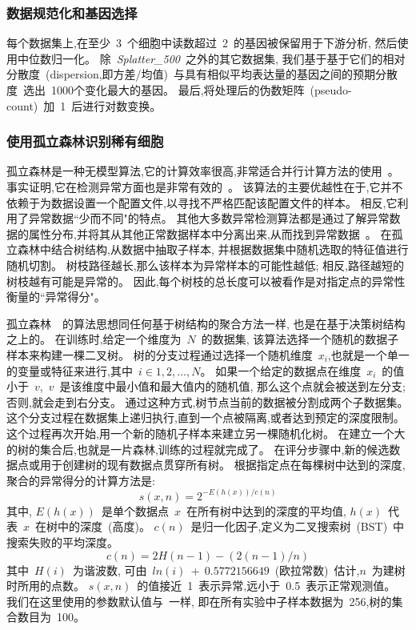 \subsubsection{数据规范化和基因选择}
\label{subsec:datapreprocessing} 
每个数据集上,在至少~3~个细胞中读数超过~2~的基因被保留用于下游分析,
然后使用中位数归一化。
除~\textit{Splatter\_500}~之外的其它数据集,
我们基于基于它们的相对分散度~(dispersion,即方差/均值)~与具有相似平均表达量的基因之间的预期分散度~\cite{zheng2017massively,macosko2015highly}选出~1000个变化最大的基因。
最后,将处理后的伪数矩阵~(pseudo-count)~加~1~后进行对数变换。

\subsubsection{使用孤立森林识别稀有细胞}
\label{subsec:if} 

孤立森林是一种无模型算法,它的计算效率很高,非常适合并行计算方法的使用~\cite{hariri2018batch}。
事实证明,它在检测异常方面也是非常有效的~\cite{susto2017anomaly}。
该算法的主要优越性在于,它并不依赖于为数据设置一个配置文件,以寻找不严格匹配该配置文件的样本。
相反,它利用了异常数据``少而不同"的特点。
其他大多数异常检测算法都是通过了解异常数据的属性分布,并将其从其他正常数据样本中分离出来,从而找到异常数据~\cite{noto2010anomaly,chen2011ordinal,das2016incorporating}。
在孤立森林中结合树结构,从数据中抽取子样本,
并根据数据集中随机选取的特征值进行随机切割。
树枝路径越长,那么该样本为异常样本的可能性越低;
相反,路径越短的树枝越有可能是异常的。
因此,每个树枝的总长度可以被看作是对指定点的异常性衡量的``异常得分"。

孤立森林~\cite{liu2008isolation,liu2012isolation}~的算法思想同任何基于树结构的聚合方法一样,
也是在基于决策树结构之上的。
在训练时,给定一个维度为~$N$~的数据集,
该算法选择一个随机的数据子样本来构建一棵二叉树。
树的分支过程通过选择一个随机维度~$x_i$,也就是一个单一的变量或特征来进行,其中~$i \in {1,2,\ldots,N}$。
如果一个给定的数据点在维度~$x_i$~的值小于~$v$,~$v$~是该维度中最小值和最大值内的随机值,
那么这个点就会被送到左分支;否则,就会走到右分支。
通过这种方式,树节点当前的数据被分割成两个子数据集。
这个分支过程在数据集上递归执行,直到一个点被隔离,或者达到预定的深度限制。
这个过程再次开始,用一个新的随机子样本来建立另一棵随机化树。
在建立一个大的树的集合后,也就是一片森林,训练的过程就完成了。
在评分步骤中,新的候选数据点或用于创建树的现有数据点贯穿所有树。
根据指定点在每棵树中达到的深度,聚合的异常得分的计算方法是:
\begin{equation}
    \label{as}
    s(x,n) = 2^{-E(h(x))/c(n)}
\end{equation}
其中, $E(h(x))$~是单个数据点~$x$~在所有树中达到的深度的平均值, $h(x)$~代表~$x$~在树中的深度~(高度)。 
$c(n)$~是归一化因子,定义为二叉搜索树~(BST)~中搜索失败的平均深度。
\begin{equation}
    \label{lab:as}
    c(n) = 2H(n - 1) - (2(n - 1)/n)
\end{equation}
其中~$H(i)$~为谐波数,
可由~$ln(i)~+~0.5772156649$~(欧拉常数)~\cite{liu2012isolation}估计,$n$~为建树时所用的点数。
$s(x,n)$~的值接近~1~表示异常,远小于~0.5~表示正常观测值。
我们在这里使用的参数默认值与~\cite{liu2008isolation,liu2012isolation}一样,
即在所有实验中子样本数据为~256,树的集合数目为~100。

